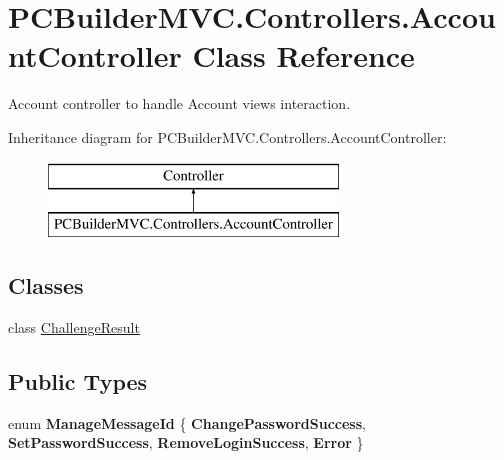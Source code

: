 \hypertarget{class_p_c_builder_m_v_c_1_1_controllers_1_1_account_controller}{}\section{P\+C\+Builder\+M\+V\+C.\+Controllers.\+Account\+Controller Class Reference}
\label{class_p_c_builder_m_v_c_1_1_controllers_1_1_account_controller}


Account controller to handle Account views interaction.  


Inheritance diagram for P\+C\+Builder\+M\+V\+C.\+Controllers.\+Account\+Controller\+:\begin{figure}[H]
\begin{center}
\leavevmode
\includegraphics[height=2.000000cm]{class_p_c_builder_m_v_c_1_1_controllers_1_1_account_controller}
\end{center}
\end{figure}
\subsection*{Classes}
\begin{DoxyCompactItemize}
\item 
class \hyperlink{class_p_c_builder_m_v_c_1_1_controllers_1_1_account_controller_1_1_challenge_result}{Challenge\+Result}
\end{DoxyCompactItemize}
\subsection*{Public Types}
\begin{DoxyCompactItemize}
\item 
enum {\bfseries Manage\+Message\+Id} \{ {\bfseries Change\+Password\+Success}, 
{\bfseries Set\+Password\+Success}, 
{\bfseries Remove\+Login\+Success}, 
{\bfseries Error}
 \}\hypertarget{class_p_c_builder_m_v_c_1_1_controllers_1_1_account_controller_ad3692d193cfffaef23c5b0b72b7b69ab}{}\label{class_p_c_builder_m_v_c_1_1_controllers_1_1_account_controller_ad3692d193cfffaef23c5b0b72b7b69ab}

\end{DoxyCompactItemize}
